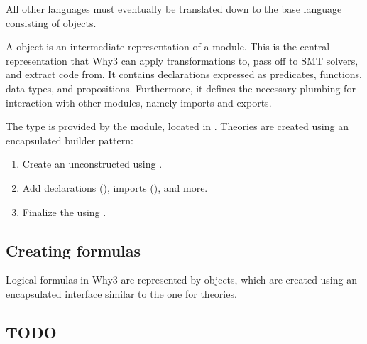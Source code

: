 All other languages must eventually be translated down to the base language
consisting of  objects.

A  object is an intermediate representation of a module.
This is the central representation that Why3 can apply transformations to,
pass off to SMT solvers, and extract code from.
It contains declarations expressed as predicates, functions, data types, and propositions.
Furthermore, it defines the necessary plumbing for interaction with other modules,
namely imports and exports.

The  type is provided by the  module,
located in .
Theories are created using an encapsulated builder pattern:
\begin{enumerate}
    \item Create an unconstructed  using .
    \item Add declarations (), imports (), and more.
    \item Finalize the  using .
\end{enumerate}

\subsection{Creating formulas}

Logical formulas in Why3 are represented by  objects,
which are created using an encapsulated interface similar to the one for theories.





\subsection{TODO} %
